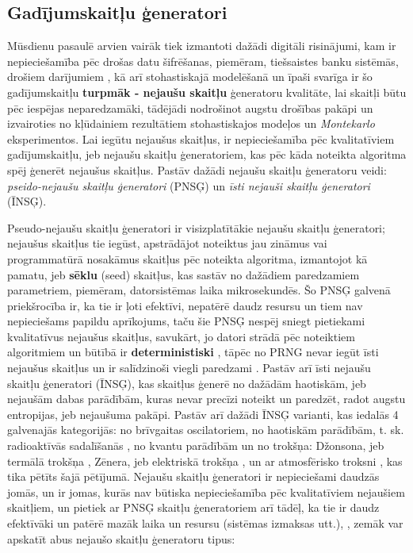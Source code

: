 \documentclass[12pt]{article}
\begin{document}
    \subsection{Gadījumskaitļu ģeneratori}
    Mūsdienu pasaulē arvien vairāk tiek izmantoti dažādi digitāli risinājumi, kam ir nepieciešamība pēc drošas datu šifrēšanas, piemēram, tiešsaistes banku sistēmās, drošiem darījumiem \parencite{new_century_generation}, kā arī stohastiskajā modelēšanā un īpaši svarīga ir šo gadījumskaitļu \textbf{turpmāk - nejaušu skaitļu} ģeneratoru kvalitāte, lai skaitļi būtu pēc iespējas neparedzamāki, tādējādi nodrošinot augstu drošības pakāpi un izvairoties no kļūdainiem rezultātiem stohastiskajos modeļos un \textit{Montekarlo} eksperimentos. \parencite{notsoeasytofind}
    Lai iegūtu nejaušus skaitļus, ir nepieciešamība pēc kvalitatīviem gadījumskaitļu, jeb nejaušu skaitļu ģeneratoriem, kas pēc kāda noteikta algoritma spēj ģenerēt nejaušus skaitļus. Pastāv dažādi nejaušu skaitļu ģeneratoru veidi: \emph{pseido-nejaušu skaitļu ģeneratori} (PNSĢ) un \emph{īsti nejauši skaitļu ģeneratori} (ĪNSĢ).
    \par Pseudo-nejaušu skaitļu ģeneratori ir visizplatītākie nejaušu skaitļu ģeneratori; nejaušus skaitļus tie iegūst, apstrādājot noteiktus jau zināmus vai programmatūrā nosakāmus skaitļus pēc noteikta algoritma, izmantojot kā pamatu, jeb \textbf{sēklu} (seed) skaitļus, kas sastāv no dažādiem paredzamiem parametriem, piemēram, datorsistēmas laika mikrosekundēs. \parencite{pseudo} Šo PNSĢ galvenā priekšrocība ir, ka tie ir ļoti efektīvi, nepatērē daudz resursu un tiem nav nepieciešams papildu aprīkojums, taču šie PNSĢ nespēj sniegt 
    pietiekami kvalitatīvus nejaušus skaitļus, savukārt, jo datori strādā pēc noteiktiem algoritmiem un būtībā ir \textbf{deterministiski} \parencite{nist_ir_slikts}, tāpēc no PRNG nevar iegūt īsti nejaušus skaitļus un ir salīdzinoši viegli paredzami \parencite{pseudo}. Pastāv arī īsti nejaušu skaitļu ģeneratori (ĪNSĢ), kas skaitļus ģenerē no dažādām haotiskām, jeb nejaušām dabas parādībām, kuras nevar
    precīzi noteikt un paredzēt, radot augstu entropijas, jeb nejaušuma pakāpi.\parencite{patiesinejausie} Pastāv arī dažādi ĪNSĢ varianti, kas iedalās 4 galvenajās kategorijās:  no brīvgaitas oscilatoriem, no haotiskām parādībām, t. sk. radioaktīvās sadalīšanās \parencite{radioaktivais_troksnis}, no kvantu parādībām un no trokšņa: Džonsona, jeb  termālā trokšņa \parencite{dzonsona_troksnis}, Zēnera, jeb elektriskā trokšņa \parencite{elektriskais_troksnis}, un ar atmosfērisko troksni \parencite{patiesinejausie}, kas tika pētīts šajā pētījumā. Nejaušu skaitļu ģeneratori ir nepieciešami daudzās jomās,
    un ir jomas, kurās nav būtiska nepieciešamība pēc kvalitatīviem nejaušiem skaitļiem, un pietiek ar PNSĢ skaitļu
    ģeneratoriem arī tādēļ, ka tie ir daudz efektīvāki un patērē mazāk laika un resursu (sistēmas izmaksas utt.),
    \parencite{randomorg}, zemāk var apskatīt abus nejaušo skaitļu ģeneratoru tipus:
    
\end{document}
